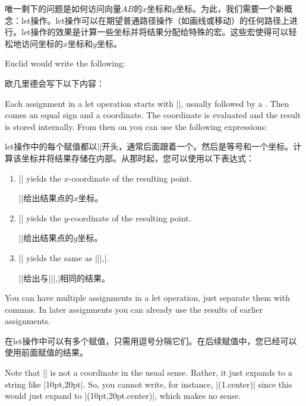 唯一剩下的问题是如何访问向量$AB$的$x$坐标和$y$坐标。为此，我们需要一个新概念：let操作。let操作可以在期望普通路径操作（如画线或移动）的任何路径上进行。let操作的效果是计算一些坐标并将结果分配给特殊的宏。这些宏使得可以轻松地访问坐标的$x$坐标和$y$坐标。


Euclid would write the following:

欧几里德会写下以下内容：

%
\begin{codeexample}[preamble={\usetikzlibrary{calc}}]
\end{codeexample}

Each assignment in a let operation starts with |\p|, usually followed by a
. Then comes an equal sign and a coordinate. The coordinate is
evaluated and the result is stored internally. From then on you can use the
following expressions:
%

let操作中的每个赋值都以|\p|开头，通常后面跟着一个。然后是等号和一个坐标。计算该坐标并将结果存储在内部。从那时起，您可以使用以下表达式：

\begin{enumerate}
    \item |\x| yields the $x$-coordinate of the resulting point.

    |\x|给出结果点的$x$坐标。
    \item |\y| yields the $y$-coordinate of the resulting point.

    |\y|给出结果点的$y$坐标。
    \item |\p| yields the same as
        |\x||,\y|.

|\p|给出与|\x||,\y|相同的结果。
\end{enumerate}
%
You can have multiple assignments in a let operation, just separate them with
commas. In later assignments you can already use the results of earlier
assignments.

在let操作中可以有多个赋值，只需用逗号分隔它们。在后续赋值中，您已经可以使用前面赋值的结果。

Note that || is not a coordinate in the usual sense. Rather, it just expands
to a string like |10pt,20pt|. So, you cannot write, for instance,
|(\p1.center)| since this would just expand to |(10pt,20pt.center)|, which
makes no sense.

